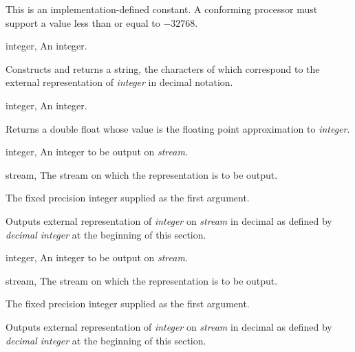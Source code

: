 \begin{optDefinition}

\remarks%
This is an implementation-defined constant.  A conforming processor
must support a value less than or equal to
$-32768$.

%
\begin{specargs}
    \item[integer, \classref{int}] An integer.
\end{specargs}
%
\result%
Constructs and returns a string, the characters of which correspond to
the external representation of {\em integer\/} in decimal notation.

\begin{specargs}
\item[integer, \classref{int}] An integer.
\end{specargs}

\result%
Returns a double float whose value is the floating point approximation
to {\em integer}.

\begin{specargs}
\item[integer, \classref{int}] An integer to be output on {\em stream}.
\item[stream, \classref{stream}] The stream on which the representation is
to be output.
\end{specargs}

\result%
The fixed precision integer supplied as the first argument.

\remarks%
Outputs external representation of {\em integer\/} on {\em stream\/}
in decimal as defined by {\em decimal integer} at the beginning of
this section.

\begin{specargs}
\item[integer, \classref{int}] An integer to be output on {\em stream}.
\item[stream, \classref{stream}] The stream on which the representation is
to be output.
\end{specargs}

\result%
The fixed precision integer supplied as the first argument.

\remarks%
Outputs external representation of {\em integer\/} on {\em stream\/}
in decimal as defined by {\em decimal integer} at the beginning of
this section.

\end{optDefinition}
